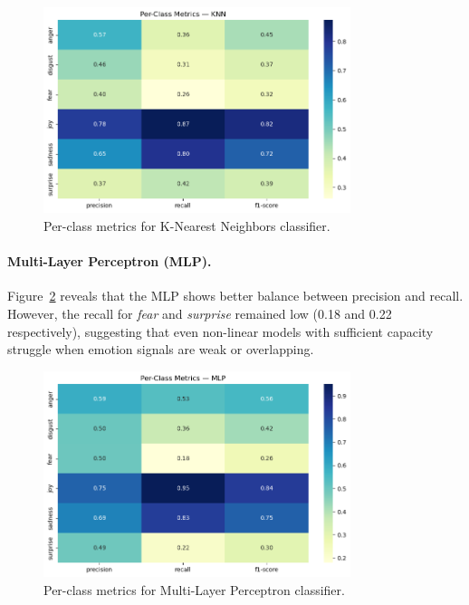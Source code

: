 \documentclass{article}
\begin{document}
\begin{figure}[H]
\centering
\includegraphics[width=0.8\textwidth]{Graphics/per_class_score/per_class_knn.png}
\caption{Per-class metrics for K-Nearest Neighbors classifier.}
\label{fig:per_class_knn}
\end{figure}


\paragraph{Multi-Layer Perceptron (MLP).}
Figure~\ref{fig:per_class_mlp} reveals that the MLP shows better balance between precision and recall. However, the recall for \textit{fear} and \textit{surprise} remained low (0.18 and 0.22 respectively), suggesting that even non-linear models with sufficient capacity struggle when emotion signals are weak or overlapping.

\begin{figure}[H]
\centering
\includegraphics[width=0.8\textwidth]{Graphics/per_class_score/per_class_mlp.png}
\caption{Per-class metrics for Multi-Layer Perceptron classifier.}
\label{fig:per_class_mlp}
\end{figure}
\end{document}
